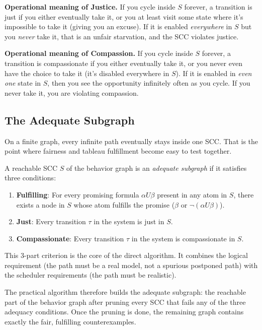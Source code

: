 \medskip\noindent
\textbf{Operational meaning of Justice.} If you cycle inside $S$ forever, a transition is just if you either eventually take it, or you at least visit some state where it's impossible to take it (giving you an excuse). If it is enabled \emph{everywhere} in $S$ but you \emph{never} take it, that is an unfair starvation, and the SCC violates justice.

\medskip\noindent
\textbf{Operational meaning of Compassion.} If you cycle inside $S$ forever, a transition is compassionate if you either eventually take it, or you never even have the choice to take it (it's disabled everywhere in $S$). If it is enabled in \emph{even one} state in $S$, then you see the opportunity infinitely often as you cycle. If you never take it, you are violating compassion.

\subsection{The Adequate Subgraph}

On a finite graph, every infinite path eventually stays inside one SCC. That is the point where fairness and tableau fulfillment become easy to test together.

\begin{definition}
A reachable SCC $S$ of the behavior graph is an \emph{adequate subgraph} if it satisfies three conditions:
\begin{enumerate}
  \item \textbf{Fulfilling}: For every promising formula $\alpha U \beta$ present in any atom in $S$, there exists a node in $S$ whose atom fulfills the promise ($\beta$ or $\neg(\alpha U \beta)$).
  \item \textbf{Just}: Every transition $\tau$ in the system is just in $S$.
  \item \textbf{Compassionate}: Every transition $\tau$ in the system is compassionate in $S$.
\end{enumerate}
\end{definition}

This 3-part criterion is the core of the direct algorithm. It combines the logical requirement (the path must be a real model, not a spurious postponed path) with the scheduler requirements (the path must be realistic). 

\medskip\noindent
The practical algorithm therefore builds the adequate subgraph: the reachable part of the behavior graph after pruning every SCC that fails any of the three adequacy conditions. Once the pruning is done, the remaining graph contains exactly the fair, fulfilling counterexamples.


